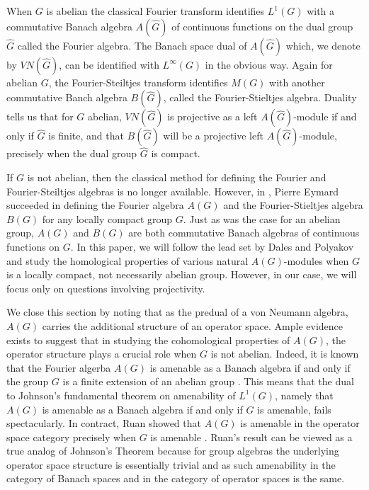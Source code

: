 \documentclass[10pt]{amsart}
\numberwithin{thm}{section}
\numberwithin{equation}{section}
\begin{document}
When $G$ is abelian the classical Fourier transform identifies $L^{1}(G)$ with a commutative Banach algebra 
$A(\widehat {G})$ of continuous functions on the dual group $\widehat G$ called the Fourier algebra. The Banach space dual of $A(\widehat {G})$
which, we denote by $VN(\widehat {G})$, can be identified with $L^{\infty}(G)$ in the obvious way. Again for abelian $G$, 
the Fourier-Steiltjes transform identifies $M(G)$ with another commutative Banch algebra $B(\widehat {G})$, called the Fourier-Stieltjes algebra. 
Duality tells us that for $G$ abelian, $VN(\widehat {G})$ is projective as a left $A(\widehat {G})$-module if and only if 
$\widehat {G}$ is finite, and that $B(\widehat {G})$ 
will be a projective  left $A(\widehat {G})$-module, precisely when the dual group $\widehat {G}$ is compact.  

If $G$ is not abelian, then the classical method for defining the Fourier and Fourier-Steiltjes algebras is 
no longer available. However, in \cite{Eymard}, Pierre Eymard succeeded in defining the Fourier algebra $A(G)$ and 
the Fourier-Stieltjes algebra $B(G)$ for any locally compact group $G$. Just as was the case for an abelian group, 
$A(G)$ and $B(G)$ are both commutative Banach algebras of continuous functions on $G$. In this paper, we will follow 
the lead set by Dales and Polyakov and 
study the homological properties of various natural $A(G)$-modules when $G$ is a locally compact, not necessarily abelian group. 
However, in our case, we will focus only on questions involving projectivity. 

We close this section by noting that as the predual of a von Neumann algebra, $A(G)$ carries the additional structure of
an operator space. Ample evidence exists to suggest that in studying the cohomological properties of $A(G)$, the operator structure 
plays a crucial role when $G$ is not abelian. Indeed, it is known that the Fourier algerba $A(G)$ is amenable as a 
Banach algebra if and only if the group $G$ is a finite extension of an abelian group \cite{ForRun}. This means that the dual to 
Johnson's fundamental theorem on amenability of $L^{1}(G)$, namely that $A(G)$ is amenable as a Banach algebra if 
and only if $G$ is amenable, fails spectacularly. In contract, Ruan showed that $A(G)$ is amenable in the operator 
space category precisely when $G$ is amenable \cite{Ru}. Ruan's result can be viewed as a true analog of Johnson's Theorem 
because for group algebras the underlying operator space structure is essentially trivial and as such amenability 
in the category of Banach spaces and in the category of operator spaces is the same.
\end{document}
